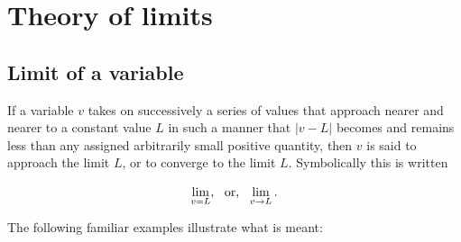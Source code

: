 
\chapter{Theory of limits}
\label{ch:3}

\section{Limit of a variable}
\label{sec:13}

If a variable $v$ takes on successively a series of values 
that approach nearer and nearer to a constant value $L$ 
in such a manner that $| v - L |$ becomes and remains 
less than any assigned arbitrarily small positive quantity, 
then $v$ is said to approach the limit $L$, or to converge 
to the limit $L$. Symbolically this is written

\[
\lim_{v = L},\ \ {\rm or},\ \ \lim_{v \to L}. 
\]

The following familiar examples illustrate what is meant:

